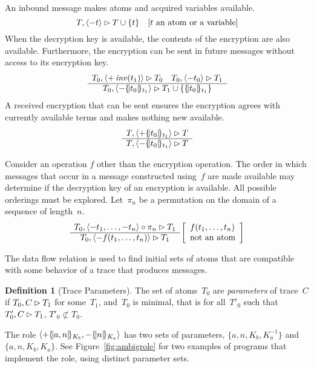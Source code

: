 \documentclass[12pt]{report}
\theoremstyle{definition}
\newtheorem{defn}{Definition}[chapter]
\begin{document}
An inbound message makes atoms and acquired variables available.
$$T,\langle-t\rangle\rhd T\cup\{t\}\quad [\mbox{$t$ an atom or a variable}]$$
When the decryption key is available, the contents of the encryption
are also available.  Furthermore, the encryption can be sent in future
messages without access to its encryption key.
$$\begin{array}{c}T_0,\langle+\operatorname{\mathit{inv}}(t_1)\rangle\rhd T_0\quad
  T_0,\langle-t_0\rangle\rhd T_1\\\hline\relax
  T_0,\langle-\{\!|t_0|\!\}_{t_1}\rangle\rhd T_1\cup\{\{\!|t_0|\!\}_{t_1}\}\end{array}$$ A received
encryption that can be sent ensures the encryption agrees with
currently available terms and makes nothing new available.
$$\begin{array}{c}T,\langle+\{\!|t_0|\!\}_{t_1}\rangle\rhd T\\\hline\relax
  T,\langle-\{\!|t_0|\!\}_{t_1}\rangle\rhd T\end{array}$$

Consider an operation $f$ other than the encryption operation.  The
order in which messages that occur in a message constructed using~$f$
are made available may determine if the decryption key of an
encryption is available.  All possible orderings must be explored.
Let~$\pi_n$ be a permutation on the domain of a sequence of
length~$n$.
$$\infer{\flow{T_0}{\seq{-t_1,\ldots,-t_{n}}\circ\pi_n}{T_1}}%
{\flow{T_0}{\seq{-f(t_1,\ldots,t_{n})}}{T_1}}
\left[\begin{array}{l}
f(t_1,\ldots,t_{n})\\
\mbox{not an atom}
\end{array}\right]$$

The data flow relation is used to find initial sets of atoms that are
compatible with some behavior of a trace that produces messages.

\begin{defn}[Trace Parameters]
The set of atoms~$T_0$ are \emph{parameters} of
trace~$C$ if $T_0,C\rhd T_1$ for some~$T_1$, and~$T_0$ is
minimal, that is for all~$T'_0$ such that $T'_0,C\rhd T_1$,
$T'_0\not\subset T_0$.
\end{defn}

The role $\langle\mathord +\{\!|a,n|\!\}_{K_b},\mathord -\{\!|n|\!\}_{K_a}\rangle$ has two sets
of parameters, $\{a,n,K_b,K^{-1}_a\}$ and $\{a,n,K_b,K_a\}$.  See
Figure~\ref{fig:ambigrole} for two examples of programs that implement
the role, using distinct parameter sets.
\end{document}
